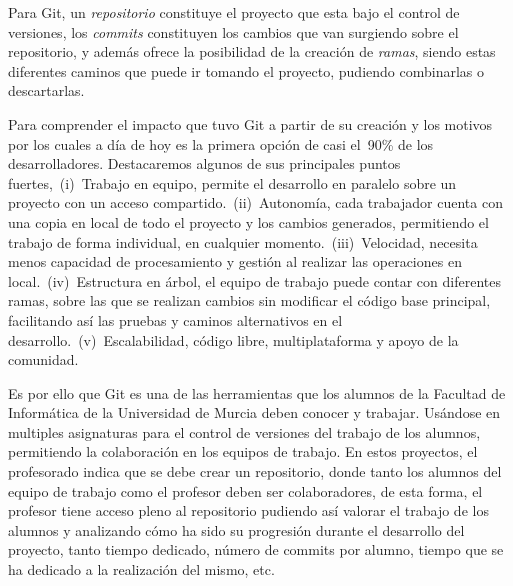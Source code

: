 Para Git, un \textit{repositorio} constituye el proyecto que esta bajo el
control de versiones, los \textit{commits} constituyen los cambios que van
surgiendo sobre el repositorio, y además ofrece la posibilidad de la
creación de \textit{ramas}, siendo estas diferentes caminos que puede ir
tomando el proyecto, pudiendo combinarlas o descartarlas.



Para comprender el impacto que tuvo Git a partir de su creación y los
motivos por los cuales a día de hoy es la primera opción de casi el~90\% de
los desarrolladores. Destacaremos algunos de sus principales puntos
fuertes,~(i)~Trabajo en equipo, permite el desarrollo en paralelo sobre un
proyecto con un acceso compartido.~(ii)~Autonomía, cada trabajador cuenta
con una copia en local de todo el proyecto y los cambios generados,
permitiendo el trabajo de forma individual, en cualquier
momento.~(iii)~Velocidad, necesita menos capacidad de procesamiento y
gestión al realizar las operaciones en local.~(iv)~Estructura en árbol, el
equipo de trabajo puede contar con diferentes ramas, sobre las que se
realizan cambios sin modificar el código base principal, facilitando así
las pruebas y caminos alternativos en el desarrollo.~(v)~Escalabilidad,
código libre, multiplataforma y apoyo de la comunidad.

Es por ello que Git es una de las herramientas que los alumnos de la
Facultad de Informática de la Universidad de Murcia deben conocer y
trabajar. Usándose en multiples asignaturas para el control de versiones
del trabajo de los alumnos, permitiendo la colaboración en los equipos de
trabajo. En estos proyectos, el profesorado indica que se debe crear un
repositorio, donde tanto los alumnos del equipo de trabajo como el profesor
deben ser colaboradores, de esta forma, el profesor tiene acceso pleno al
repositorio pudiendo así valorar el trabajo de los alumnos y analizando
cómo ha sido su progresión durante el desarrollo del proyecto, tanto tiempo
dedicado, número de commits por alumno, tiempo que se ha dedicado a la
realización del mismo, etc.


